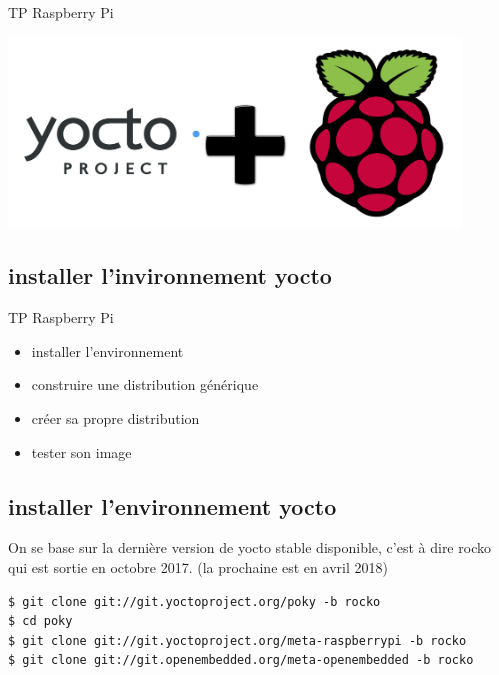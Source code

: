 \documentclass[compress]{smilebeamer}
\begin{document}
\begin{frame}{TP Raspberry Pi}
\begin{center}
\includegraphics[width=0.9\textwidth]{logos/yocto_plus_raspberry_pi.png}
\end{center}
\end{frame}

\subsection{installer l'invironnement yocto}
\begin{frame}{TP Raspberry Pi}
\begin{itemize}
	\item installer l'environnement
	\item construire une distribution générique
	\item créer sa propre distribution
	\item tester son image
\end{itemize}
\end{frame}

\subsection{installer l'environnement yocto}
\begin{frame}[fragile]
On se base sur la dernière version de yocto stable disponible, c'est à dire rocko qui est sortie en octobre 2017. (la prochaine est en avril 2018)
\begin{lstlisting}[style=shell]
$ git clone git://git.yoctoproject.org/poky -b rocko
$ cd poky
$ git clone git://git.yoctoproject.org/meta-raspberrypi -b rocko
$ git clone git://git.openembedded.org/meta-openembedded -b rocko
\end{lstlisting}
\end{frame}
\end{document}
